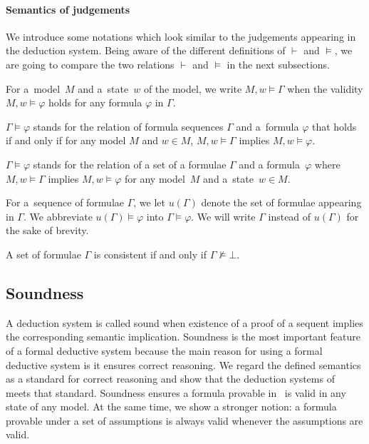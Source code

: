     \paragraph{Semantics of judgements}

    We introduce some notations which look similar to the judgements appearing in the
    deduction
    system.
    Being aware of the different definitions of $\vdash$ and $\models$, we are going to
    compare the two relations $\vdash$ and $\models$ in the next subsections.

    \begin{notation}
     For a~model~$M$ and a~state~$w$ of the model,
     we write $M,w\models \Gamma$ when the validity
     $M,w\models\varphi$ holds for any formula $\varphi$ in $\Gamma$.
    \end{notation}

    \begin{notation}
     $\Gamma\models\varphi$ stands for the relation of formula
     sequences $\Gamma$ and a~formula
     $\varphi$ that holds if and only if for any model $M$
     and $w\in M$, $M,w\models \Gamma$ implies
     $M,w\models \varphi$.
    \end{notation}

    \begin{definition}
     $\Gamma\models\varphi$ stands for the relation of a set of a formulae
     $\Gamma$ and a formula~$\varphi$ where $M,w\models \Gamma$ implies
     $M,w\models \varphi$ for any model~$M$
     and a~state~$w\in M$.
    \end{definition}
    For a~sequence of formulae $\Gamma$, we let $u(\Gamma)$ denote the set of formulae
    appearing in $\Gamma$.  We abbreviate $u(\Gamma)\models\varphi$ into
    $\Gamma\models\varphi$. We will write $\Gamma$ instead of $u(\Gamma)$ for the
    sake of brevity.

    \begin{definition}
     A set of formulae $\Gamma$ is consistent if and only if $\Gamma\not\models \bot$.
    \end{definition}

  \subsection{Soundness}

  A deduction system is called sound when existence of a proof of
  a sequent implies the corresponding semantic implication.
  Soundness is the most important feature of a formal deductive system because the
  main reason for using a formal deductive system is it ensures correct reasoning.
  We regard the defined semantics as a standard for correct reasoning and show that the
  deduction systems of \iec\, meets that standard.
  Soundness ensures a formula provable in \iec\, is valid in any state of any model.
  At the same time, we show a stronger notion:
  a formula provable under a set of assumptions is always valid whenever the assumptions are
  valid.

